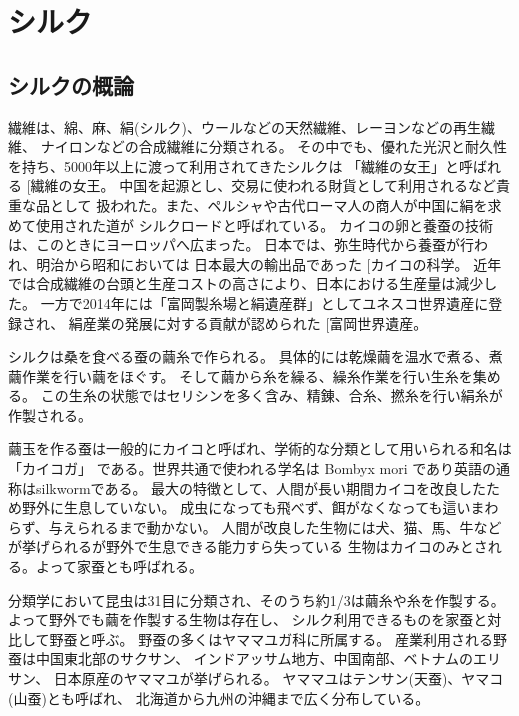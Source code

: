 \documentclass[dvipdfmx,12pt,a4paper]{jreport}
\makeatletter
\DeclareRobustCommand\cite{\unskip
    	\@ifnextchar[{\@tempswatrue\@citex}{\@tempswafalse\@citex[]}}
\makeatother
\begin{document}
		\section{シルク}
		\subsection{シルクの概論}
		繊維は、綿、麻、絹(シルク)、ウールなどの天然繊維、レーヨンなどの再生繊維、
		ナイロンなどの合成繊維に分類される。
		その中でも、優れた光沢と耐久性を持ち、5000年以上に渡って利用されてきたシルクは
		「繊維の女王」と呼ばれる\cite{繊維の女王}。
		中国を起源とし、交易に使われる財貨として利用されるなど貴重な品として
		扱われた。また、ペルシャや古代ローマ人の商人が中国に絹を求めて使用された道が
		シルクロードと呼ばれている。
		カイコの卵と養蚕の技術は、このときにヨーロッパへ広まった。
		日本では、弥生時代から養蚕が行われ、明治から昭和においては
		日本最大の輸出品であった\cite{カイコの科学}。
		近年では合成繊維の台頭と生産コストの高さにより、日本における生産量は減少した。
		一方で2014年には「富岡製糸場と絹遺産群」としてユネスコ世界遺産に登録され、
		絹産業の発展に対する貢献が認められた\cite{富岡世界遺産}。

		シルクは桑を食べる蚕の繭糸で作られる。
		具体的には乾燥繭を温水で煮る、煮繭作業を行い繭をほぐす。
		そして繭から糸を繰る、繰糸作業を行い生糸を集める。
		この生糸の状態ではセリシンを多く含み、精錬、合糸、撚糸を行い絹糸が作製される。
		
		繭玉を作る蚕は一般的にカイコと呼ばれ、学術的な分類として用いられる和名は「カイコガ」
		である。世界共通で使われる学名は Bombyx mori であり英語の通称はsilkwormである。
		最大の特徴として、人間が長い期間カイコを改良したため野外に生息していない。
		成虫になっても飛べず、餌がなくなっても這いまわらず、与えられるまで動かない。
		人間が改良した生物には犬、猫、馬、牛などが挙げられるが野外で生息できる能力すら失っている
		生物はカイコのみとされる。よって家蚕とも呼ばれる。

		分類学において昆虫は31目に分類され、そのうち約1/3は繭糸や糸を作製する。
		よって野外でも繭を作製する生物は存在し、
		シルク利用できるものを家蚕と対比して野蚕と呼ぶ。
		野蚕の多くはヤママユガ科に所属する。
		産業利用される野蚕は中国東北部のサクサン、
		インドアッサム地方、中国南部、ベトナムのエリサン、
		日本原産のヤママユが挙げられる。
		ヤママユはテンサン(天蚕)、ヤマコ(山蚕)とも呼ばれ、
		北海道から九州の沖縄まで広く分布している。
\end{document}
